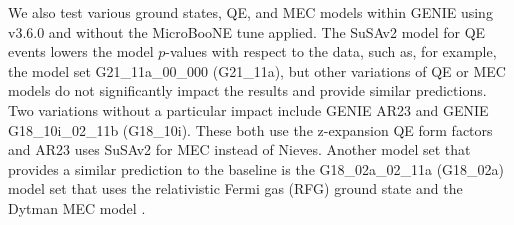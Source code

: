 \documentclass[amsmath,amssymb,aps,prd,showpacs,twocolumn,superscriptaddress,letterpaper,longbibliography, floatfix]{revtex4-2}
\begin{document}
We also test various ground states, QE, and MEC models within GENIE using v3.6.0 and without the MicroBooNE tune applied. The SuSAv2 \cite{SuSAv2} model for QE events lowers the model $p$-values with respect to the data, such as, for example, the model set G21\_11a\_00\_000 (G21\_11a), but other variations of QE or MEC models do not significantly impact the results and provide similar predictions. Two variations without a particular impact include GENIE AR23 and GENIE G18\_10i\_02\_11b (G18\_10i). These both use the z-expansion QE form factors and AR23 uses SuSAv2 for MEC instead of Nieves. Another model set that provides a similar prediction to the baseline is the G18\_02a\_02\_11a (G18\_02a) model set that uses the relativistic Fermi gas (RFG) ground state and the Dytman MEC model \cite{DytmanMECModel}. \\
\end{document}
